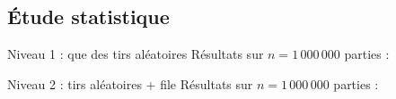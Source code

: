 \subsection{Étude statistique}

\begin{frame}{Niveau 1 : que des tirs aléatoires}
Résultats sur $n=1\,000\,000$ parties :
\begin{center}
\end{center}
\end{frame}

\begin{frame}{Niveau 2 : tirs aléatoires + file}
Résultats sur $n=1\,000\,000$ parties :
\begin{center}
\end{center}
\end{frame}

